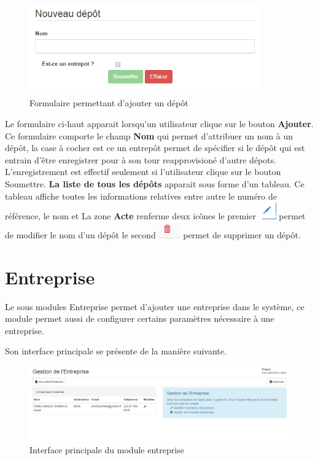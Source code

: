 \documentclass[12pt,a4paper]{report}
\begin{document}
\begin{figure}[h]
\begin{center}
\includegraphics[width=10cm]{pic/NewStore.png}
\end{center}
\caption{Formulaire permettant d'ajouter un dépôt}
\label{Formulaire permettant d'ajouter un dépôt}
\end{figure}

Le formulaire ci-haut apparait lorsqu'un utilisateur clique sur le bouton \textbf{Ajouter}. Ce formulaire comporte le champ \textbf{Nom} qui permet d'attribuer un nom à un dépôt, la case à cocher est ce un entrepôt permet de spécifier si le dépôt qui est entrain d'être enregistrer pour à son tour reapprovisioné d'autre dépots.
L'enregistrement est effectif seulement si l'utilisateur clique sur le bouton Soumettre. \textbf{La liste de tous les dépôts} apparait sous forme d'un tableau. Ce tableau affiche toutes les informations relatives entre autre le numéro de référence, le nom et La zone \textbf{Acte} renferme deux icônes le premier \includegraphics[scale=0.7]{pic/EditUser.png}  permet de modifier le nom d'un dépôt le second \includegraphics[scale=0.7]{pic/DeleteWRed.png} permet de supprimer un dépôt.

\newpage
\section{Entreprise}
Le sous modules Entreprise permet d'ajouter une entreprise dans le système, ce module permet aussi de configurer certains paramètres nécessaire à une entreprise.

Son interface principale se présente de la manière suivante.

\begin{figure}[h]
\begin{center}
\includegraphics[width=14cm]{pic/ModuleEntreprise.png}
\end{center}
\caption{Interface principale du module entreprise}
\label{Interface principale du module entreprise}
\end{figure} 
\end{document}
